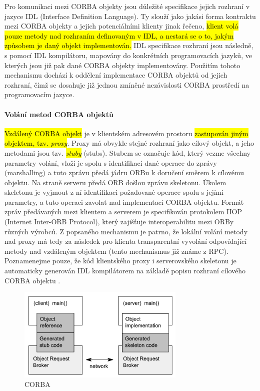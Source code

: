 Pro komunikaci mezi CORBA objekty jsou důležité specifikace jejich rozhraní v  jazyce IDL (Interface Definition Language). Ty slouží jako jakási forma kontraktu mezi CORBA objekty a jejich potenciálními klienty jinak řečeno, \hl{klient volá pouze metody nad rozhraním definovaným v IDL, a nestará se o to, jakým způsobem je daný objekt implementován.} IDL specifikace rozhraní jsou následně, s pomocí IDL kompilátoru, mapovány do konkrétních programovacích jazyků, ve kterých jsou již pak dané CORBA objekty implementovány. Použitím tohoto mechanismu dochází k oddělení implementace CORBA objektů od jejich rozhraní, čímž se dosahuje již jednou zmíněné nezávislosti CORBA prostředí na programovacím jazyce.

\paragraph{Volání metod CORBA objektů}
\hl{Vzdálený CORBA objekt} je v klientském adresovém prostoru \hl{zastupován jiným objektem, tzv. \textit{proxy}}. Proxy má obvykle stejné rozhraní jako cílový objekt, a jeho metodami jsou tzv. \hl{\textit{stuby}} (stubs). Stubem se označuje kód, který vezme všechny parametry volání, vloží je spolu s identifikací dané operace do zprávy (marshalling) a tuto zprávu předá jádru ORBu k doručení směrem k cílovému objektu. Na straně serveru předá ORB došlou zprávu skeletonu. Úkolem skeletonu je vyjmout z ní identifikaci požadované operace spolu s jejími parametry, a tuto 
operaci zavolat nad implementací CORBA objektu. Formát zpráv předávaných mezi klientem a serverem je specifikován protokolem  IIOP (Internet Inter-ORB Protocol), který zajišťuje interoperabilitu mezi ORBy různých výrobců.
Z popsaného mechanismu je patrno, že lokální volání metody nad proxy má tedy za následek pro klienta transparentní vyvolání odpovídající metody nad vzdáleným objektem (tento mechanismus již známe z RPC). Poznamenejme pouze, že kód klientského proxy i serverovského skeletonu je automaticky generován IDL kompilátorem na základě popisu rozhraní cílového CORBA objektu \cite{corba}.

\begin{figure}[h!]
\centering
\includegraphics[width=80mm]{10/images/corba}
\caption{CORBA}
\end{figure}


